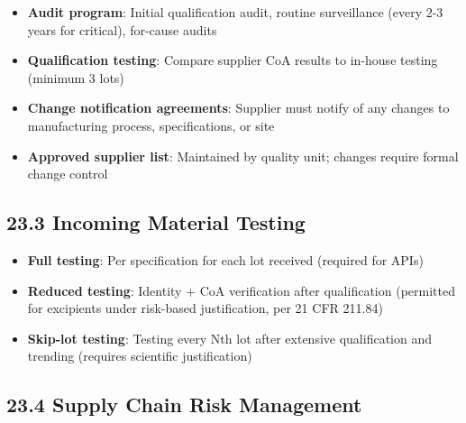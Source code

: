 \documentclass[
  11pt,
  a4paper,
]{report}
\providecommand{\tightlist}{%
  \setlength{\itemsep}{0pt}\setlength{\parskip}{0pt}}
\begin{document}
\begin{itemize}
\tightlist
\item
  \textbf{Audit program}: Initial qualification audit, routine
  surveillance (every 2-3 years for critical), for-cause audits
\item
  \textbf{Qualification testing}: Compare supplier CoA results to
  in-house testing (minimum 3 lots)
\item
  \textbf{Change notification agreements}: Supplier must notify of any
  changes to manufacturing process, specifications, or site
\item
  \textbf{Approved supplier list}: Maintained by quality unit; changes
  require formal change control
\end{itemize}

\hypertarget{incoming-material-testing}{%
\subsection{23.3 Incoming Material
Testing}\label{incoming-material-testing}}

\begin{itemize}
\tightlist
\item
  \textbf{Full testing}: Per specification for each lot received
  (required for APIs)
\item
  \textbf{Reduced testing}: Identity + CoA verification after
  qualification (permitted for excipients under risk-based
  justification, per 21 CFR 211.84)
\item
  \textbf{Skip-lot testing}: Testing every Nth lot after extensive
  qualification and trending (requires scientific justification)
\end{itemize}

\hypertarget{supply-chain-risk-management}{%
\subsection{23.4 Supply Chain Risk
Management}\label{supply-chain-risk-management}}
\end{document}
